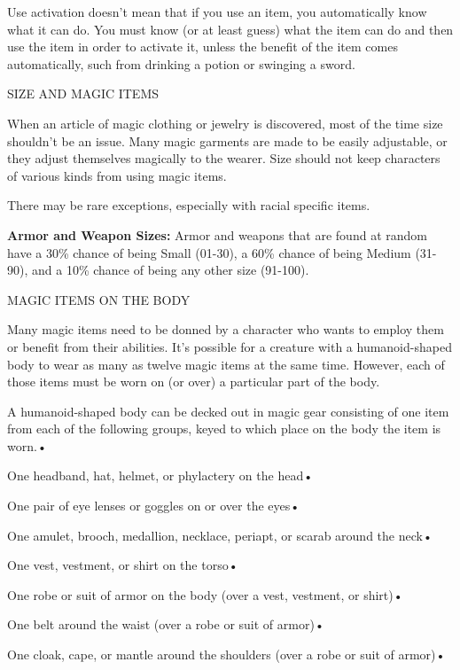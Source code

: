 \documentclass{article}
\begin{document}
Use activation doesn't mean that if you use an item, you automatically know what 
it can do. You must know (or at least guess) what the item can do and then use 
the item in order to activate it, unless the benefit of the item comes automatically, 
such from drinking a potion or swinging a sword.

\vspace{12pt}
{\large{}SIZE AND MAGIC ITEMS}

When an article of magic clothing or jewelry is discovered, most of the time size 
shouldn't be an issue. Many magic garments are made to be easily adjustable, or 
they adjust themselves magically to the wearer. Size should not keep characters 
of various kinds from using magic items.

There may be rare exceptions, especially with racial specific items. 

\textbf{Armor and Weapon Sizes: }Armor and weapons that are found at random have 
a 30\% chance of being Small (01-30), a 60\% chance of being Medium (31-90), and 
a 10\% chance of being any other size (91-100).

\vspace{12pt}
{\large{}MAGIC ITEMS ON THE BODY}

Many magic items need to be donned by a character who wants to employ them or benefit 
from their abilities. It's possible for a creature with a humanoid-shaped body 
to wear as many as twelve magic items at the same time. However, each of those 
items must be worn on (or over) a particular part of the body.

A humanoid-shaped body can be decked out in magic gear consisting of one item from 
each of the following groups, keyed to which place on the body the item is worn.• 

\parindent=3pt
One headband, hat, helmet, or phylactery on the head• 

One pair of eye lenses or goggles on or over the eyes• 

\parindent=7pt
One amulet, brooch, medallion, necklace, periapt, or scarab around the neck• 

\parindent=3pt
One vest, vestment, or shirt on the torso• 

One robe or suit of armor on the body (over a vest, vestment, or shirt)• 

\parindent=7pt
One belt around the waist (over a robe or suit of armor)• 

\parindent=3pt
One cloak, cape, or mantle around the shoulders (over a robe or suit of armor)• 
\end{document}
